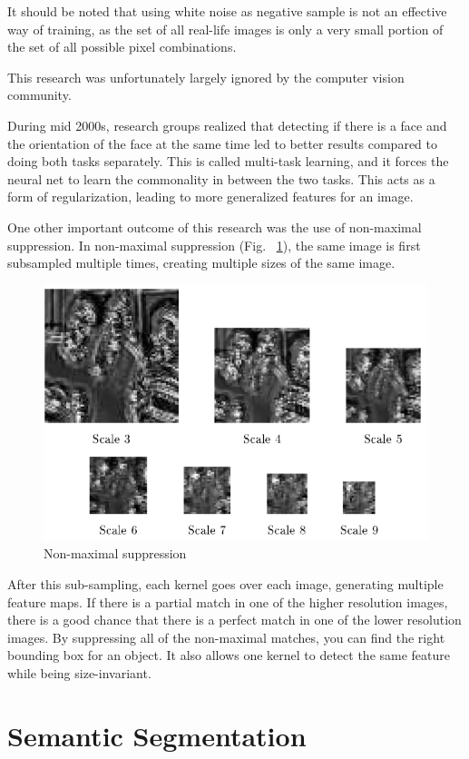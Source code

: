 It should be noted that using white noise as negative sample is not an effective way of training, as the set of all real-life images is only a very small portion of the set of all possible pixel combinations.

This research was unfortunately largely ignored by the computer vision community.

During mid 2000s, research groups realized that detecting if there is a face and the orientation of the face at the same time led to better results compared to doing both tasks separately.
This is called multi-task learning, and it forces the neural net to learn the commonality in between the two tasks.
This acts as a form of regularization, leading to more generalized features for an image.

One other important outcome of this research was the use of non-maximal suppression.
In non-maximal suppression (Fig. ~\ref{fig:NonMaxSupp}), the same image is first subsampled multiple times, creating multiple sizes of the same image.

\begin{figure}[ht]
\centering
	\includegraphics[width=0.5\linewidth]{figs/non-max-supp.png}
	 \caption{Non-maximal suppression}
	\label{fig:NonMaxSupp}
\end{figure}

After this sub-sampling, each kernel goes over each image, generating multiple feature maps.
If there is a partial match in one of the higher resolution images, there is a good chance that there is a perfect match in one of the lower resolution images.
By suppressing all of the non-maximal matches, you can find the right bounding box for an object.
It also allows one kernel to detect the same feature while being size-invariant.



\section{Semantic Segmentation}

